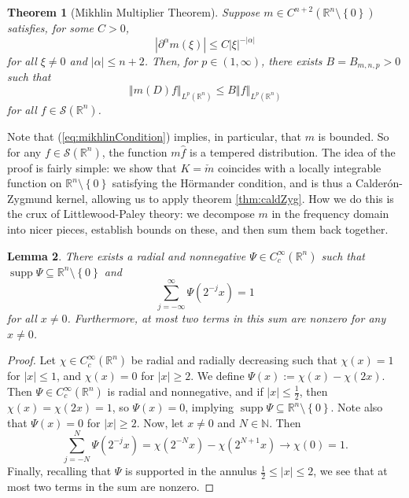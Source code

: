 \documentclass{book}
\newcommand{\scrS}{\mathscr{S}}
\newcommand{\bbN}{\mathbb{N}}
\newcommand{\bbR}{\mathbb{R}}
\newcommand{\abs}[1]{\left\lvert {#1} \right\rvert}
\newcommand{\norm}[1]{\left\Vert {#1} \right\Vert}
\newcommand{\set}[1]{\left\{ {#1} \right\}}
\DeclareMathOperator{\supp}{supp}
\newtheorem{theorem}{Theorem}[chapter]
\newtheorem{lemma}[theorem]{Lemma}
\theoremstyle{definition}
\theoremstyle{remark}
\numberwithin{equation}{chapter}
\begin{document}
\begin{theorem}[Mikhlin Multiplier Theorem] \label{thm:mikhlin}
    Suppose $m \in C^{n+2}(\bbR^n \setminus \set{0})$ satisfies, for some $C > 0$,
    \begin{equation} \label{eq:mikhlinCondition}
        \abs{\partial^\alpha m(\xi)} \leq C \abs{\xi}^{-\abs{\alpha}}
    \end{equation}
    for all $\xi \neq 0$ and $\abs{\alpha} \leq n+2$. Then, for $p \in (1,\infty)$, there exists $B = B_{m,n,p} > 0$ such that
    \begin{equation}
        \norm{m(D)f}_{L^p(\bbR^n)} \leq B \norm{f}_{L^p(\bbR^n)}
    \end{equation}
    for all $f \in \scrS(\bbR^n)$.
\end{theorem}
Note that (\ref{eq:mikhlinCondition}) implies, in particular, that $m$ is bounded. So for any $f \in \scrS(\bbR^n)$, the function $m\widehat{f}$ is a tempered distribution. The idea of the proof is fairly simple: we show that $K = \check{m}$ coincides with a locally integrable function on $\bbR^n \setminus \set{0}$ satisfying the H\"ormander condition, and is thus a Calder\'on-Zygmund kernel, allowing us to apply theorem \ref{thm:caldZyg}. How we do this is the crux of Littlewood-Paley theory: we decompose $m$ in the frequency domain into nicer pieces, establish bounds on these, and then sum them back together. 
\begin{lemma}
    There exists a radial and nonnegative $\Psi \in C_c^\infty(\bbR^n)$ such that $\supp{\Psi} \subseteq \bbR^n \setminus \set{0}$ and 
    \begin{equation}
        \sum_{j=-\infty}^\infty \Psi(2^{-j} x) = 1
    \end{equation}
    for all $x \neq 0$. Furthermore, at most two terms in this sum are nonzero for any $x \neq 0$.
\end{lemma}
\begin{proof}
    Let $\chi \in C_c^\infty(\bbR^n)$ be radial and radially decreasing such that $\chi(x) = 1$ for $\abs{x} \leq 1$, and $\chi(x) = 0$ for $\abs{x} \geq 2$. We define $\Psi(x) := \chi(x) - \chi(2x)$. Then $\Psi \in C_c^\infty(\bbR^n)$ is radial and nonnegative, and if $\abs{x} \leq \frac{1}{2}$, then $\chi(x) = \chi(2x) = 1$, so $\Psi(x) = 0$, implying $\supp{\Psi} \subseteq \bbR^n \setminus \set{0}$. Note also that $\Psi(x) = 0$ for $\abs{x} \geq 2$. Now, let $x \neq 0$ and $N \in \bbN$. Then 
    \begin{equation}
        \sum_{j = -N}^N \Psi(2^{-j} x) = \chi(2^{-N} x) - \chi(2^{N+1} x) \to \chi(0) = 1.
    \end{equation}
    Finally, recalling that $\Psi$ is supported in the annulus $\frac{1}{2} \leq \abs{x} \leq 2$, we see that at most two terms in the sum are nonzero.
\end{proof}
\end{document}
